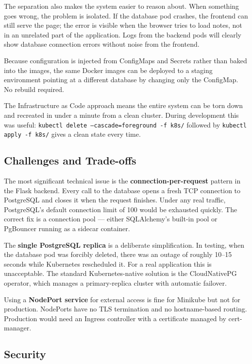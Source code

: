 \documentclass[12pt,a4paper]{article}
\begin{document}
The separation also makes the system easier to reason about. When something goes wrong, the problem is isolated. If the database pod crashes, the frontend can still serve the page; the error is visible when the browser tries to load notes, not in an unrelated part of the application. Logs from the backend pods will clearly show database connection errors without noise from the frontend.

Because configuration is injected from ConfigMaps and Secrets rather than baked into the images, the same Docker images can be deployed to a staging environment pointing at a different database by changing only the ConfigMap. No rebuild required.

The Infrastructure as Code approach means the entire system can be torn down and recreated in under a minute from a clean cluster. During development this was useful: \texttt{kubectl delete --cascade=foreground -f k8s/} followed by \texttt{kubectl apply -f k8s/} gives a clean state every time.

\subsection{Challenges and Trade-offs}

The most significant technical issue is the \textbf{connection-per-request} pattern in the Flask backend. Every call to the database opens a fresh TCP connection to PostgreSQL and closes it when the request finishes. Under any real traffic, PostgreSQL's default connection limit of 100 would be exhausted quickly. The correct fix is a connection pool --- either SQLAlchemy's built-in pool or PgBouncer running as a sidecar container.

The \textbf{single PostgreSQL replica} is a deliberate simplification. In testing, when the database pod was forcibly deleted, there was an outage of roughly 10--15 seconds while Kubernetes rescheduled it. For a real application this is unacceptable. The standard Kubernetes-native solution is the CloudNativePG operator, which manages a primary-replica cluster with automatic failover.

Using a \textbf{NodePort service} for external access is fine for Minikube but not for production. NodePorts have no TLS termination and no hostname-based routing. Production would need an Ingress controller with a certificate managed by cert-manager.

\subsection{Security}
\end{document}
